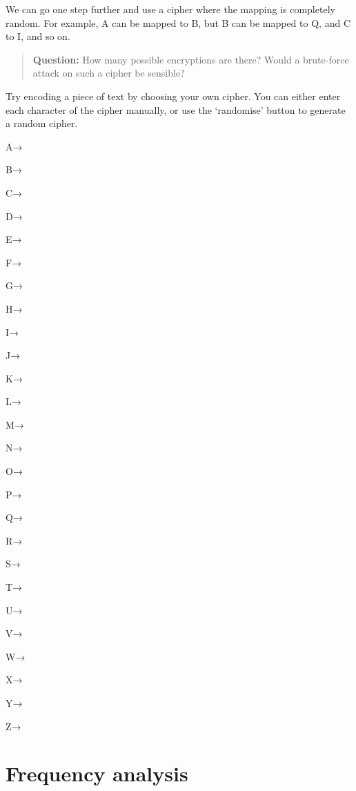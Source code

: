 \documentclass[
  letterpaper,
  DIV=11,
  numbers=noendperiod]{scrreprt}
\begin{document}
We can go one step further and use a cipher where the mapping is
completely random. For example, A can be mapped to B, but B can be
mapped to Q, and C to I, and so on.

\begin{quote}
\textbf{Question:} How many possible encryptions are there? Would a
brute-force attack on such a cipher be sensible?
\end{quote}

Try encoding a piece of text by choosing your own cipher. You can either
enter each character of the cipher manually, or use the `randomise'
button to generate a random cipher.

\leavevmode{}%

\hypertarget{letters}{}
\hypertarget{a}{}
A→

\hypertarget{b}{}
B→

\hypertarget{c}{}
C→

\hypertarget{d}{}
D→

\hypertarget{e}{}
E→

\hypertarget{f}{}
F→

\hypertarget{g}{}
G→

\hypertarget{h}{}
H→

\hypertarget{i}{}
I→

\hypertarget{j}{}
J→

\hypertarget{k}{}
K→

\hypertarget{l}{}
L→

\hypertarget{m}{}
M→

\hypertarget{n}{}
N→

\hypertarget{o}{}
O→

\hypertarget{p}{}
P→

\hypertarget{q}{}
Q→

\hypertarget{r}{}
R→

\hypertarget{s}{}
S→

\hypertarget{t}{}
T→

\hypertarget{u}{}
U→

\hypertarget{v}{}
V→

\hypertarget{w}{}
W→

\hypertarget{x}{}
X→

\hypertarget{y}{}
Y→

\hypertarget{z}{}
Z→

\hypertarget{encode-remaining}{}

\hypertarget{frequency-analysis}{%
\section{Frequency analysis}\label{frequency-analysis}}
\end{document}
